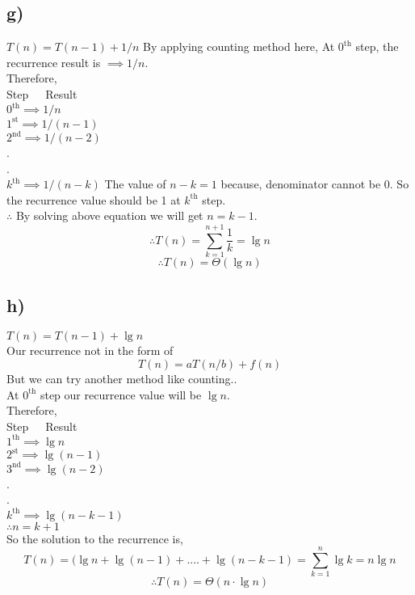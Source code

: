 \documentclass[a4paper, 11pt]{article}
\begin{document}
\subsection*{g)}
$T(n) = T(n-1) + 1/n$
By applying counting method here,
At $0^{\text{th}}$ step, the recurrence result is $\implies 1/n$.\\
Therefore,\\
Step \,\,\,\,\, Result\\
$0^{\text{th}} \implies 1/n$\\
$1^{\text{st}} \implies 1/(n-1)$\\
$2^{\text{nd}} \implies 1/(n-2)$\\
.\\
.\\  
$k^{\text{th}} \implies 1/(n-k)$ The value of $n-k = 1 $ because, denominator cannot be 0. So the recurrence value should be 1 at $k^{\text{th}}$ step. \\
$\therefore $ By solving above equation we will get $n=k-1$.
$$\therefore T(n) = \sum_{k=1}^{n+1} \frac{1}{k} = \lg n$$
$$\therefore T(n) = \Theta (\lg n)$$

\subsection*{h)}
$T(n) = T(n-1) + \lg n$\\
Our recurrence not in the form of
$$T(n) = aT(n/b) +f(n) $$
But we can try another method like counting..\\
At $0^{\text{th}}$ step our recurrence value will be $\lg n$.\\
Therefore,\\
Step \,\,\,\,\,  Result\\
$1^{\text{th}} \implies \lg n$\\
$2^{\text{st}} \implies \lg (n-1)$\\
$3^{\text{nd}} \implies \lg (n-2)$\\
.\\
.\\  
$k^{\text{th}} \implies \lg (n-k-1)$\\
$\therefore n=k+1 $\\
So the solution to the recurrence is,
$$T(n) = (\lg n + \lg (n-1) + ....+\lg(n-k-1) = \sum_{k=1}^{n} \lg k = n\lg n$$
$$\therefore T(n) = \Theta(n \cdot \lg n)$$
\end{document}
